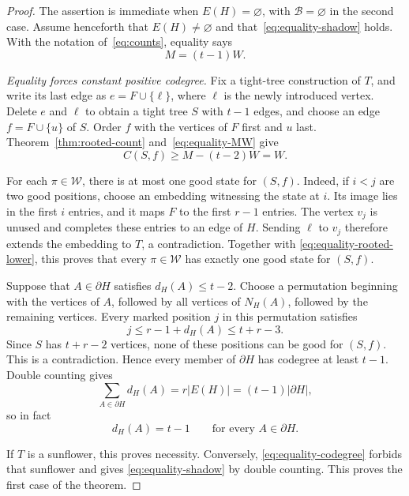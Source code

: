 \documentclass[10pt,a4paper]{amsart}
\newcommand{\Wcal}{\mathcal W}
\newcommand{\sh}{\partial}
\begin{document}
	\begin{proof}
		The assertion is immediate when $E(H)=\varnothing$, with
		$\mathcal B=\varnothing$ in the second case. Assume henceforth
		that $E(H)\ne\varnothing$ and that~\eqref{eq:equality-shadow}
		holds. With the notation of~\eqref{eq:counts}, equality says
		\begin{equation}\label{eq:equality-MW}
			M=(t-1)W.
		\end{equation}
		
		\medskip\noindent
		\emph{Equality forces constant positive codegree.}
		Fix a tight-tree construction of $T$, and write its last edge as
		$e=F\cup\{\ell\}$, where $\ell$ is the newly introduced vertex.
		Delete $e$ and $\ell$ to obtain a tight tree $S$ with $t-1$ edges,
		and choose an edge $f=F\cup\{u\}$ of $S$. Order $f$ with the
		vertices of $F$ first and $u$ last. Theorem~\ref{thm:rooted-count}
		and~\eqref{eq:equality-MW} give
		\begin{equation}\label{eq:equality-rooted-lower}
			C(S,f)\ge M-(t-2)W=W.
		\end{equation}
		
		For each $\pi\in\Wcal$, there is at most one good state for
		$(S,f)$. Indeed, if $i<j$ are two good positions, choose an
		embedding witnessing the state at $i$. Its image lies in the
		first $i$ entries, and it maps $F$ to the first $r-1$ entries.
		The vertex $v_j$ is unused and completes these entries to an
		edge of $H$. Sending $\ell$ to $v_j$ therefore extends the
		embedding to $T$, a contradiction. Together with
		\eqref{eq:equality-rooted-lower}, this proves that every
		$\pi\in\Wcal$ has exactly one good state for $(S,f)$.
		
		\bigskip
		
		Suppose that $A\in\sh H$ satisfies $d_H(A)\le t-2$. Choose
		a permutation beginning with the vertices of $A$, followed by
		all vertices of $N_H(A)$, followed by the remaining vertices.
		Every marked position $j$ in this permutation satisfies
		\[
		j\le r-1+d_H(A)\le t+r-3.
		\]
		Since $S$ has $t+r-2$ vertices, none of these positions can be
		good for $(S,f)$. This is a contradiction. Hence every member
		of $\sh H$ has codegree at least $t-1$. Double counting gives
		\[
		\sum_{A\in\sh H}d_H(A)=r|E(H)|=(t-1)|\sh H|,
		\]
		so in fact
		\begin{equation}\label{eq:equality-codegree}
			d_H(A)=t-1\qquad\text{for every }A\in\sh H.
		\end{equation}
		
		If $T$ is a sunflower, this proves necessity. Conversely,
		\eqref{eq:equality-codegree} forbids that sunflower and gives
		\eqref{eq:equality-shadow} by double counting. This proves
		the first case of the theorem.
		

\end{proof}
\end{document}
